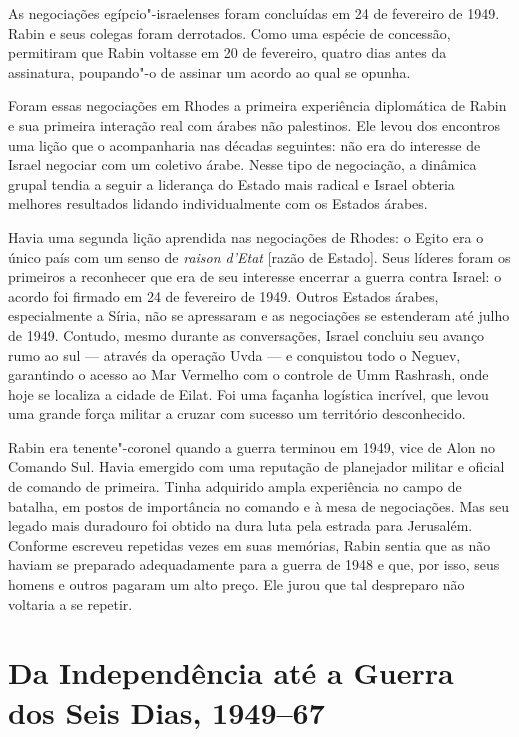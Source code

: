 As negociações egípcio"-israelenses foram concluídas em 24 de fevereiro
de 1949. Rabin e seus colegas foram derrotados. Como uma espécie de
concessão, permitiram que Rabin voltasse em 20 de fevereiro, quatro dias
antes da assinatura, poupando"-o de assinar um acordo ao qual se opunha.

Foram essas negociações em Rhodes a primeira experiência diplomática de
Rabin e sua primeira interação real com árabes não palestinos. Ele levou
dos encontros uma lição que o acompanharia nas décadas seguintes: não
era do interesse de Israel negociar com um coletivo árabe. Nesse tipo de
negociação, a dinâmica grupal tendia a seguir a liderança do Estado mais
radical e Israel obteria melhores resultados lidando individualmente com
os Estados árabes.

Havia uma segunda lição aprendida nas negociações de Rhodes: o Egito era
o único país com um senso de \emph{raison d'Etat} {[}razão de Estado{]}. Seus líderes foram os
primeiros a reconhecer que era de seu interesse encerrar a guerra contra
Israel: o acordo foi firmado em 24 de fevereiro de 1949. Outros Estados
árabes, especialmente a Síria, não se apressaram e as negociações se
estenderam até julho de 1949. Contudo, mesmo durante as conversações, Israel
concluiu seu avanço rumo ao sul --- através da operação Uvda --- e
conquistou todo o Neguev, garantindo o acesso ao Mar Vermelho com o
controle de Umm Rashrash, onde hoje se localiza a cidade de Eilat. Foi
uma façanha logística incrível, que levou uma grande força militar a
cruzar com sucesso um território desconhecido.

Rabin era tenente"-coronel quando a guerra terminou em 1949, vice de Alon
no Comando Sul. Havia emergido com uma reputação de planejador militar e
oficial de comando de primeira. Tinha adquirido ampla experiência no
campo de batalha, em postos de importância no comando e à mesa de
negociações. Mas seu legado mais duradouro foi obtido na dura
luta pela estrada para Jerusalém. Conforme escreveu repetidas vezes em
suas memórias, Rabin sentia que as  não haviam se preparado
adequadamente para a guerra de 1948 e que, por isso, seus homens e
outros pagaram um alto preço. Ele jurou que tal despreparo não voltaria
a se repetir.

\chapter[Da Independência até a Guerra dos Seis Dias, 1949--67]{Da Independência até a Guerra\\ dos Seis Dias, 1949--67}

